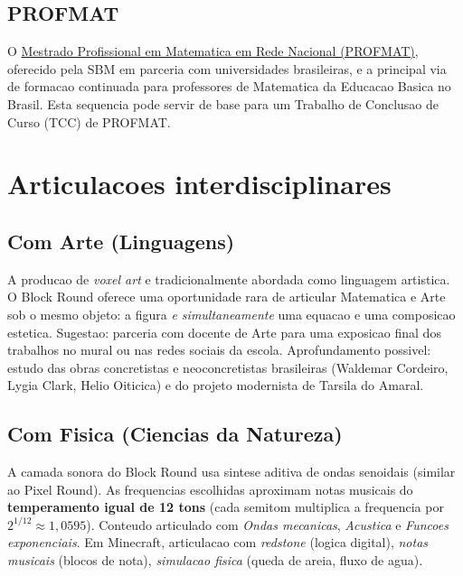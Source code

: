 \documentclass[12pt,a4paper]{scrartcl}
\newcommand{\acc}[1]{\textcolor{accent}{\textbf{#1}}}
\begin{document}
\subsection{PROFMAT}

O \href{https://www.profmat-sbm.org.br/}{Mestrado Profissional em Matematica em Rede Nacional (PROFMAT)}, oferecido pela SBM em parceria com universidades brasileiras, e a principal via de formacao continuada para professores de Matematica da Educacao Basica no Brasil. Esta sequencia pode servir de base para um Trabalho de Conclusao de Curso (TCC) de PROFMAT.

\section{Articulacoes interdisciplinares}\label{sec:interdisc}

\subsection{Com Arte (Linguagens)}
A producao de \emph{voxel art} e tradicionalmente abordada como linguagem artistica. O Block Round oferece uma oportunidade rara de articular Matematica e Arte sob o mesmo objeto: a figura \emph{e simultaneamente} uma equacao e uma composicao estetica. Sugestao: parceria com docente de Arte para uma exposicao final dos trabalhos no mural ou nas redes sociais da escola. Aprofundamento possivel: estudo das obras concretistas e neoconcretistas brasileiras (Waldemar Cordeiro, Lygia Clark, Helio Oiticica) e do projeto modernista de Tarsila do Amaral.

\subsection{Com Fisica (Ciencias da Natureza)}
A camada sonora do Block Round usa sintese aditiva de ondas senoidais (similar ao Pixel Round). As frequencias escolhidas aproximam notas musicais do \acc{temperamento igual de 12 tons} (cada semitom multiplica a frequencia por $2^{1/12} \approx 1{,}0595$). Conteudo articulado com \emph{Ondas mecanicas}, \emph{Acustica} e \emph{Funcoes exponenciais}. Em Minecraft, articulacao com \emph{redstone} (logica digital), \emph{notas musicais} (blocos de nota), \emph{simulacao fisica} (queda de areia, fluxo de agua).
\end{document}
